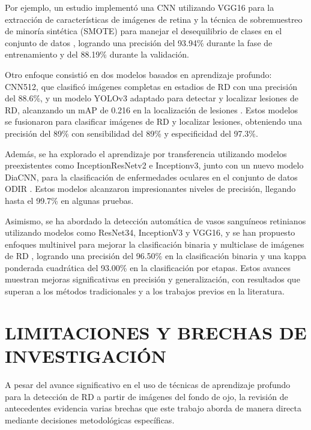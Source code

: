 Por ejemplo, un estudio implementó una CNN utilizando VGG16
para la extracción de características de imágenes de retina y la técnica de sobremuestreo
de minoría sintética (SMOTE) para manejar el desequilibrio de clases en el conjunto de
datos , logrando una precisión del 93.94\% durante la fase
de entrenamiento y del 88.19\% durante la validación.

Otro enfoque consistió en dos modelos basados en aprendizaje profundo: CNN512, que
clasificó imágenes completas en estadios de RD con una precisión del 88.6\%, y un modelo
YOLOv3 adaptado para detectar y localizar lesiones de RD, alcanzando un mAP de 0.216 en
la localización de lesiones . Estos modelos se fusionaron
para clasificar imágenes de RD y localizar lesiones, obteniendo una precisión del 89\%
con sensibilidad del 89\% y especificidad del 97.3\%.

Además, se ha explorado el aprendizaje por transferencia utilizando modelos preexistentes
como InceptionResNetv2 e Inceptionv3, junto con un nuevo modelo DiaCNN, para la
clasificación de enfermedades oculares en el conjunto de datos ODIR
. Estos modelos alcanzaron impresionantes niveles de
precisión, llegando hasta el 99.7\% en algunas pruebas.

Asimismo, se ha abordado la detección automática de vasos sanguíneos retinianos
utilizando modelos como ResNet34, InceptionV3 y VGG16, y se han propuesto enfoques
multinivel  para mejorar la clasificación binaria y
multiclase de imágenes de RD , logrando una precisión del
96.50\% en la clasificación binaria y una kappa ponderada cuadrática del 93.00\% en la
clasificación por etapas. Estos avances muestran mejoras significativas en precisión y
generalización, con resultados que superan a los métodos tradicionales y a los trabajos
previos en la literatura.

\section{LIMITACIONES Y BRECHAS DE INVESTIGACIÓN}

A pesar del avance significativo en el uso de técnicas de aprendizaje profundo para la
detección de RD a partir de imágenes del fondo de ojo, la revisión de antecedentes
evidencia varias brechas que este trabajo aborda de manera directa mediante decisiones
metodológicas específicas.

